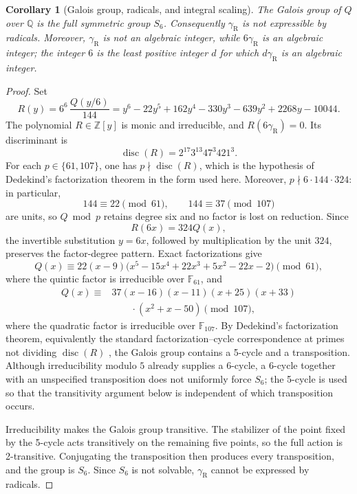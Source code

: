 \documentclass[11pt]{article}
\newtheorem{corollary}[theorem]{Corollary}
\theoremstyle{remark}
\newcommand{\gR}{\gamma_{\mathrm R}}
\begin{document}
\begin{corollary}[Galois group, radicals, and integral scaling]\label{cor:galois}
The Galois group of \(Q\) over \(\mathbb Q\) is the full symmetric group \(S_6\). Consequently \(\gR\) is not expressible by radicals. Moreover, \(\gR\) is not an algebraic integer, while \(6\gR\) is an algebraic integer; the integer \(6\) is the least positive integer \(d\) for which \(d\gR\) is an algebraic integer.
\end{corollary}

\begin{proof}
Set
\[
R(y)=6^6\,\frac{Q(y/6)}{144}
=y^6-22y^5+162y^4-330y^3-639y^2+2268y-10044.
\]
The polynomial \(R\in\mathbb Z[y]\) is monic and irreducible, and \(R(6\gR)=0\). Its discriminant is
\[
\operatorname{disc}(R)=2^{17}3^{13}47^3 421^3.
\]
For each \(p\in\{61,107\}\), one has \(p\nmid\operatorname{disc}(R)\), which is the hypothesis of Dedekind's factorization theorem in the form used here. Moreover, \(p\nmid6\cdot144\cdot324\): in particular,
\[
144\equiv22\pmod{61},\qquad 144\equiv37\pmod{107}
\]
are units, so \(Q\bmod p\) retains degree six and no factor is lost on reduction. Since
\[
R(6x)=324Q(x),
\]
the invertible substitution \(y=6x\), followed by multiplication by the unit \(324\), preserves the factor-degree pattern. Exact factorizations give
\[
Q(x)\equiv 22(x-9)
\bigl(x^5-15x^4+22x^3+5x^2-22x-2\bigr)\pmod {61},
\]
where the quintic factor is irreducible over \(\mathbb F_{61}\), and
\[
\begin{aligned}
Q(x)\equiv{}&37(x-16)(x-11)(x+25)(x+33)\\
&\qquad\cdot(x^2+x-50)\pmod {107},
\end{aligned}
\]
where the quadratic factor is irreducible over \(\mathbb F_{107}\). By Dedekind's factorization theorem, equivalently the standard factorization--cycle correspondence at primes not dividing \(\operatorname{disc}(R)\) \cite{Cox2012}, the Galois group contains a 5-cycle and a transposition. Although irreducibility modulo \(5\) already supplies a 6-cycle, a 6-cycle together with an unspecified transposition does not uniformly force \(S_6\); the 5-cycle is used so that the transitivity argument below is independent of which transposition occurs.

Irreducibility makes the Galois group transitive. The stabilizer of the point fixed by the 5-cycle acts transitively on the remaining five points, so the full action is 2-transitive. Conjugating the transposition then produces every transposition, and the group is \(S_6\). Since \(S_6\) is not solvable, \(\gR\) cannot be expressed by radicals.


\end{proof}
\end{document}
